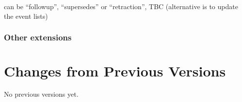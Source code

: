 \documentclass[11pt,a4paper]{ivoa}
\begin{document}
can be ``followup'', ``supersedes'' or ``retraction'', TBC (alternative is to update the event lists)

\subsubsection{Other extensions\\}



\appendix
\section{Changes from Previous Versions}

No previous versions yet.  



\end{document}
